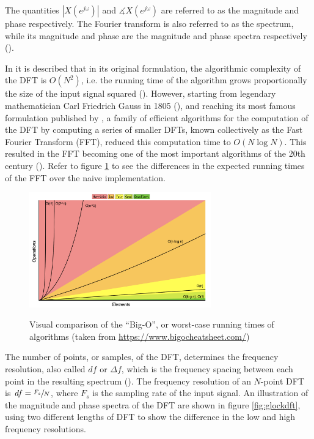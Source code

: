 \documentclass[report.tex]{subfiles}
\begin{document}
The quantities $|X(e^{j\omega})|$ and $\measuredangle X(e^{j\omega})$ are referred to as the magnitude and phase respectively. The Fourier transform is also referred to as the spectrum, while its magnitude and phase are the magnitude and phase spectra respectively (\cite{discretebook}).

In \textcite[Chapter~9]{discretebook} it is described that in its original formulation, the algorithmic complexity of the DFT is $O(N^{2})$, i.e. the running time of the algorithm grows proportionally the size of the input signal squared (\cite{skiena}). However, starting from legendary mathematician Carl Friedrich Gauss in 1805 (\cite{gausshist}), and reaching its most famous formulation published by \textcite{cooleytukey}, a family of efficient algorithms for the computation of the DFT by computing a series of smaller DFTs, known collectively as the Fast Fourier Transform (FFT), reduced this computation time to $O(N \log{N})$. This resulted in the FFT becoming one of the most important algorithms of the 20th century (\cite{ffttopten}). Refer to figure \ref{fig:bigo} to see the differences in the expected running times of the FFT over the naive implementation.

\begin{figure}[ht]
	\centering
	\includegraphics[width=0.7\textwidth]{./images-misc/bigo.png}\\
	\caption{Visual comparison of the ``Big-O'', or worst-case running times of algorithms (taken from \url{https://www.bigocheatsheet.com/})}
	\label{fig:bigo}
\end{figure}

The number of points, or samples, of the DFT, determines the frequency resolution, also called $\mathit{df}$ or $\mathit{\Delta f}$, which is the frequency spacing between each point in the resulting spectrum (\cite{discretebook}). The frequency resolution of an $N$-point DFT is $\mathit{df} = \sfrac{F_{s}}{N}$, where $F_{s}$ is the sampling rate of the input signal. An illustration of the magnitude and phase spectra of the DFT are shown in figure \ref{fig:glockdft}, using two different lengths of DFT to show the difference in the low and high frequency resolutions.
\end{document}
